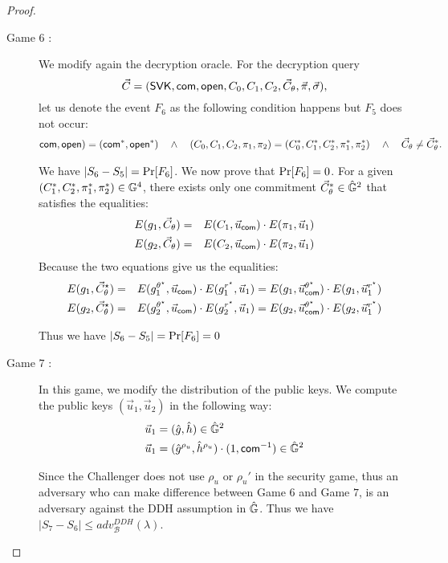\begin{proof}
\begin{description}
  \item[\textsf{Game} $6$ :] We modify again the decryption oracle. For the decryption query
    $$\vec{C} = (\mathsf{SVK}, \mathsf{com}, \mathsf{open}, C_0, C_1, C_2, \vec{C}_{\theta}, \vec{\pi}, \vec{\sigma}),$$
    let us denote the event $F_6$ as the following condition happens but $F_5$ does not occur:
    \begin{eqnarray} \label
      (\com,\open)=(\com^*,\open^*)  \quad \wedge \quad (C_0,C_1,C_2,\pi_1,\pi_2) = (C_0^*,C_1^*,C_2^*,\pi_1^*,\pi_2^*) 
      \quad \wedge \quad \vec{C}_{\theta} \neq \vec{C}_{\theta}^* .
    \end{eqnarray}

    We have $|S_6- S_5| = \operatorname{Pr}[F_6]$. We now prove that $\operatorname{Pr}[F_6] = 0$. For a given $(C_1^*,C_2^*,\pi_1^*,\pi_2^*) \in \mathbb{G}^4$, there exists only one commitment $\vec{C}_{\theta}^* \in \hat{\mathbb{G}}^2$ that satisfies the equalities:
    \begin{eqnarray*}
      E(g_1,\vec{C}_{\theta}) &=& E(C_1 , \vec{u}_{\mathsf{com}}) \cdot E(\pi_1,\vec{u}_1) \\
      E(g_2,\vec{C}_{\theta}) &=& E(C_2 , \vec{u}_{\mathsf{com}}) \cdot E(\pi_2,\vec{u}_1)
    \end{eqnarray*}
    Because the two equations give us the equalities:
    \begin{eqnarray*}  
      E(g_1,\vec{C}_{\theta}^\star) &=& E(g_1^{\theta^\star} , \vec{u}_{\mathsf{com}}) \cdot E(g_1^{r^\star},\vec{u}_1) = E(g_1 , \vec{u}_{\mathsf{com}}^{\theta^\star}) \cdot E(g_1,\vec{u}_1^{r^\star}) \\
      E(g_2,\vec{C}_{\theta}^\star) &=& E(g_2^{\theta^\star} , \vec{u}_{\mathsf{com}}) \cdot E(g_2^{r^\star},\vec{u}_1) =E(g_2 , \vec{u}_{\mathsf{com}}^{\theta^\star}) \cdot E(g_2,\vec{u}_1^{r^\star})
    \end{eqnarray*}

    Thus we have $|S_6- S_5| = \operatorname{Pr}[F_6] = 0$
    
    
  \item[\textsf{Game} $7$ :] In this game, we modify the distribution of the public keys. We compute the public keys $(\vec{u}_1, \vec{u}_2)$ in the following way:
    \begin{align*}
      \vec{u}_1 &= (\hat{g}, \hat{h}) \in \hat{\mathbb{G}}^2\\
      \vec{u}_1 &= (\hat{g}^{\rho_u}, \hat{h}^{\rho_u}) \cdot (1, \mathsf{com}^{-1}) \in \hat{\mathbb{G}}^2
    \end{align*}

    Since the Challenger does not use $\rho_u$ or $\rho_u'$ in the security game, thus an adversary who can make difference between \textsf{Game} $6$ and \textsf{Game} $7$, is an adversary against the DDH assumption in $\hat{\mathbb{G}}$. Thus we have $|S_7 - S_6| \leq adv_{\mathcal{B}}^{DDH}(\lambda)$.


\end{description}
\end{proof}
